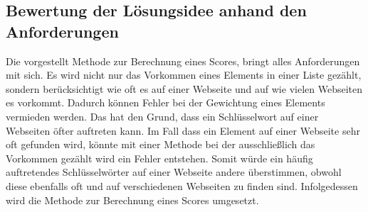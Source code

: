 	\subsection{Bewertung der Lösungsidee anhand den Anforderungen}
	Die vorgestellt Methode zur Berechnung eines Scores, bringt alles Anforderungen mit sich. Es wird nicht nur das Vorkommen eines Elements in einer Liste gezählt, sondern berücksichtigt wie oft es auf einer Webseite und auf wie vielen Webseiten es vorkommt. Dadurch können Fehler bei der Gewichtung eines Elements vermieden werden. Das hat den Grund, dass  ein Schlüsselwort auf einer Webseiten öfter auftreten kann. Im Fall dass ein Element auf einer Webseite sehr oft gefunden wird, könnte mit einer Methode bei der ausschließlich das Vorkommen gezählt wird ein Fehler entstehen.  Somit würde ein häufig auftretendes Schlüsselwörter auf einer Webseite andere überstimmen, obwohl diese ebenfalls oft und auf verschiedenen Webseiten zu finden sind. Infolgedessen wird die Methode zur Berechnung eines Scores umgesetzt.
	
